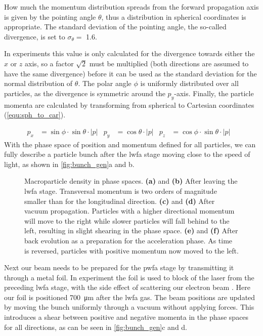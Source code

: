 \documentclass[bachelor_thesis]{subfiles}
\begin{document}
How much the momentum distribution spreads from the forward propagation axis is given by the pointing angle $\theta$, thus a distribution in spherical coordinates is appropriate. The standard deviation of the pointing angle, 
the so-called divergence, is set to $\sigma_{\theta}=$ \qty{1.6}{\mrad}.

In experiments this value is only calculated for the divergence towards either the $x$ or $z$ axis, so a factor $\sqrt{2}$ must be multiplied (both directions are assumed to have the same divergence) before 
it can be used as the standard deviation for the normal distribution of $\theta$. The polar angle $\phi$ is uniformly distributed over all particles, as the divergence is symmetric around the $p_y$-axis.
Finally, the particle momenta are calculated by transforming from spherical to Cartesian coordinates (\autoref{equ:sph_to_car}). 

\begin{align}
	p_x&=\sin{\phi} \cdot \sin{\theta} \cdot \left|p\right|	&
	p_y&=\cos{\theta} \cdot \left|p\right|				&
	p_z&=\cos{\phi} \cdot \sin{\theta} \cdot \left|p\right|	&
	\label{equ:sph_to_car}
\end{align}
With the phase space of position and momentum defined for all particles, we can fully describe a particle bunch after the \gls{lwfa} stage moving close to the speed of light, as shown in \autoref{fig:bunch_gen}a and b.

\begin{figure}
	\centering
	
	\caption{Macroparticle density in phase spaces. 
	\textbf{(a)} and \textbf{(b)} After leaving the \gls{lwfa} stage. Transversal momentum is two orders of magnitude smaller than for the longitudinal direction.
	\textbf{(c)} and \textbf{(d)} After vacuum propagation. Particles with a higher directional momentum will move to the right while slower particles will fall behind to the left, resulting in slight shearing in the phase space.
	\textbf{(e)} and \textbf{(f)} After back evolution as a preparation for the acceleration phase. As time is reversed, particles with positive momentum now moved to the left.}
	\label{fig:bunch_gen}
\end{figure}

Next our beam needs to be prepared for the \gls{pwfa} stage by transmitting it through a metal foil. In experiment the foil is used to block of the laser from the preceding \gls{lwfa} stage, 
with the side effect of scattering our electron beam \cite{Raj2020}. Here our foil is positioned \qty{700}{\um} after the \gls{lwfa} gas.
The beam positions are updated by moving the bunch uniformly through a vacuum without applying forces. This introduces a shear between positive and negative momenta in the phase spaces for all directions, as can be seen in \autoref{fig:bunch_gen}c and d.
\end{document}
